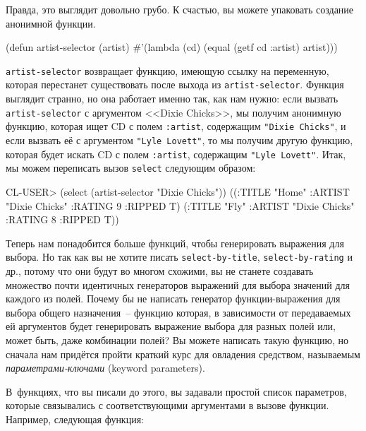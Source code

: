 Правда, это выглядит довольно грубо. К счастью, вы можете упаковать создание анонимной функции.

\begin{myverb}
(defun artist-selector (artist)
  #'(lambda (cd) (equal (getf cd :artist) artist)))
\end{myverb}

\lstinline{artist-selector} возвращает функцию, имеющую ссылку на переменную, которая
перестанет существовать после выхода из \lstinline{artist-selector}. Функция выглядит странно, но она работает
именно так, как нам нужно: если вызвать \lstinline{artist-selector} с аргументом <<Dixie
Chicks>>, мы получим анонимную функцию, которая ищет CD с полем \lstinline{:artist},
содержащим \lstinline{"Dixie Chicks"}, и если вызвать её с аргументом 
\lstinline{"Lyle Lovett"}, то мы получим другую функцию, которая будет искать CD с полем
\lstinline{:artist}, содержащим \lstinline{"Lyle Lovett"}. Итак, мы можем переписать вызов
\lstinline{select} следующим образом:

\begin{myverb}
CL-USER> (select (artist-selector "Dixie Chicks"))
  ((:TITLE "Home" :ARTIST "Dixie Chicks" :RATING 9 :RIPPED T)
   (:TITLE "Fly" :ARTIST "Dixie Chicks" :RATING 8 :RIPPED T))
\end{myverb}

Теперь нам понадобится больше функций, чтобы генерировать выражения для выбора. Но так как
вы не хотите писать \lstinline{select-by-title}, \lstinline{select-by-rating} и др., потому что они
будут во многом схожими, вы не станете создавать множество почти идентичных генераторов
выражений для выбора значений для каждого из полей. Почему бы не написать генератор
функции-выражения для выбора общего назначения~-- функцию которая, в зависимости от
передаваемых ей аргументов будет генерировать выражение выбора для разных полей или,
может быть, даже комбинации полей? Вы можете напи\-сать такую функцию, но сначала нам
придётся пройти краткий курс для овладения средством, называемым
\textit{параметрами-ключами} (keyword parameters).

В~функциях, что вы писали до этого, вы задавали простой список параметров, которые
связывались с соответствующими аргументами в вызове функции. Например, следующая функция:

